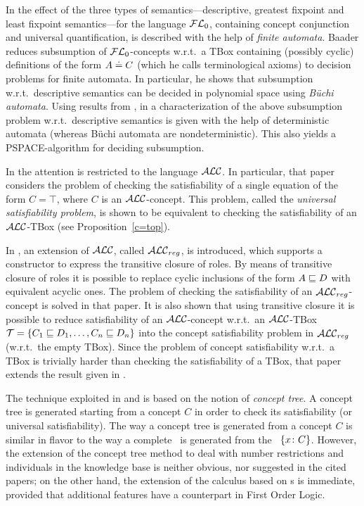 In \cite{Baad90} the effect of the three types of semantics---descriptive,
greatest fixpoint and least fixpoint semantics---for the language
${\cal FL}_0$, containing concept conjunction and universal quantification,
is described with the help of {\em finite automata}.
Baader reduces subsumption of ${\cal FL}_0$-concepts w.r.t.\ a TBox containing
(possibly cyclic) definitions of the form $A\doteq C$
(which he calls terminological axioms)
to decision problems for finite automata.
In particular, he shows that subsumption w.r.t.\ descriptive semantics can be
decided in polynomial space using {\em B\"uchi automata}.
Using results from \cite{Baad90}, in \cite{Nebe91} a characterization of the
above subsumption problem w.r.t.\ descriptive semantics is given with the
help of deterministic automata (whereas B\"uchi automata are nondeterministic).
This also yields a PSPACE-algorithm for deciding subsumption.
 
In \cite{BBHN90} the attention is restricted to the language ${\cal ALC}$.
In particular, that paper considers the problem of 
checking the satisfiability of a single
equation of the form $C=\top$, where $C$ is an ${\cal ALC}$-concept.
This problem, called the {\em universal satisfiability problem}, is shown 
to be equivalent to checking the satisfiability of an ${\cal ALC}$-TBox (see
Proposition~\ref{c=top}).

In \cite{Baad90b}, an extension of ${\cal ALC}$, called ${\cal ALC}_{reg}$, is
introduced, which supports a constructor to express the transitive
closure of roles. By means of 
transitive closure of roles it is possible to replace cyclic inclusions 
of the form $A \sqsubseteq D$ with equivalent acyclic ones.
The problem of checking the satisfiability of an
${\cal ALC}_{reg}$-concept is solved in that paper. 
It is also shown that using transitive closure it is possible to reduce  
satisfiability of an
${\cal ALC}$-concept w.r.t.\ an ${\cal ALC}$-TBox ${\cal T}=\{C_1 \sqsubseteq D_1,\dots,C_n \sqsubseteq D_n\}$ 
into the concept satisfiability problem in ${\cal ALC}_{reg}$ (w.r.t.\ the empty TBox).
Since the problem of concept satisfiability w.r.t.\ a TBox is trivially
harder than checking the satisfiability of a TBox, 
that paper extends the result given in \cite{BBHN90}.

The technique exploited in \cite{BBHN90} and \cite{Baad90b} is based on the notion of
{\em concept tree}. A concept tree is generated starting from a concept $C$ 
in order to check its satisfiability (or universal satisfiability).
The way a concept tree is generated from a concept $C$ 
is similar in flavor to the way a complete \cs\ is generated
from the \cs\ $\{x\colon C\}$.
However, the extension of the concept tree method to deal with number restrictions
and individuals in the knowledge base is neither obvious, nor suggested in the cited
papers; on the other hand, the extension of the calculus based on \cs s is immediate,
provided that additional features have a counterpart in First Order Logic.

